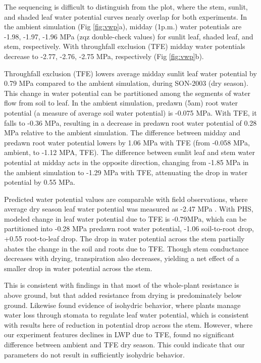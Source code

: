 \documentclass[draft,linenumbers]{agujournal}
\begin{document}
The sequencing is difficult to distinguish from the plot, where the stem, sunlit, and shaded leaf water potential curves nearly overlap for both experiments. 
In the ambient simulation (Fig \ref{fig:vwp}a), midday (1p.m.) water potentials are -1.98, -1.97, -1.96 MPa (zqz double-check values)
for sunlit leaf, shaded leaf, and stem, respectively.
With throughfall exclusion (TFE)  midday water potentials decrease to -2.77, -2.76, -2.75 MPa, respectively (Fig \ref{fig:vwp}b).

Throughfall exclusion (TFE) lowers average midday sunlit leaf water potential by 0.79 MPa compared to the ambient simulation, during SON-2003 (dry season).
This change in water potential can be partitioned among the segments of water flow from soil to leaf.
In the ambient simulation, predawn (5am) root water potential (a measure of average soil water potential) is -0.075 MPa. 
With TFE, it falls to -0.36 MPa, resulting in a decrease in predawn root water potential of 0.28 MPa relative to the ambient simulation. 
The difference between midday and predawn root water potential lowers by 1.06 MPa with TFE 
(from -0.058 MPa, ambient, to -1.12 MPA, TFE).
The difference between sunlit leaf and stem water potential at midday acts in the opposite direction, changing from
-1.85 MPa in the ambient simulation to -1.29 MPa with TFE, attenuating the drop in water potential by 0.55 MPa.

Predicted water potential values are comparable with field observations, where average dry season leaf water potential was measured as -2.47 MPa \citep{fisher2006}.
With PHS, modeled change in leaf water potential due to TFE is -0.79MPa, which can be partitioned into -0.28 MPa predawn root water potential, -1.06 soil-to-root drop, +0.55 root-to-leaf drop.
The drop in water potential across the stem partially abates the change in the soil and roots due to TFE. 
Though stem conductance decreases with drying, transpiration also decreases, yielding a net effect of a smaller drop in water potential across the stem.

This is consistent with findings in \cite{fisher2006} that most of the whole-plant resistance is above ground, but that added resistance from drying is predominately below ground.
Likewise \cite{fisher2006} found evidence of isohydric behavior, where plants manage water loss through stomata to regulate leaf water potential, 
which is consistent with results here of reduction in potential drop across the stem.
However, where our experiment features declines in LWP due to TFE, \cite{fisher2006} found no significant difference between ambient and TFE dry season.
This could indicate that our parameters do not result in sufficiently isohydric behavior.
\end{document}
